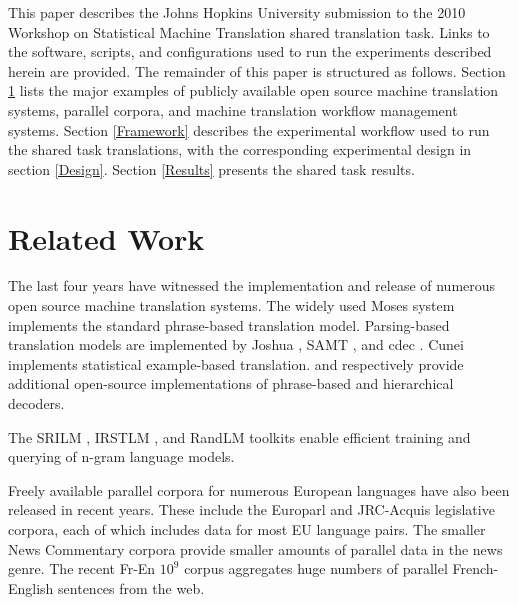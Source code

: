 \documentclass[11pt, a4paper]{article}
\begin{document}
This paper describes the Johns Hopkins University submission to the 2010 Workshop on Statistical Machine Translation shared translation task. Links to the software, scripts, and configurations used to run the experiments described herein are provided. The remainder of this paper is structured as follows. Section \ref{Related Work} lists the major examples of publicly available open source machine translation systems, parallel corpora, and machine translation workflow management systems. Section \ref{Framework} describes the experimental workflow used to run the shared task translations, with the corresponding experimental design in section \ref{Design}. Section \ref{Results} presents the shared task results.






\begin{figure*}[htbp]

\caption{Machine translation workflow. Square nodes in grey indicate software and scripts. The scripts and configuration files used to implement and run this workflow are available for download at \url{http://sourceforge.net/projects/joshua/files/joshua/1.3/wmt2010-experiment.tgz}}
\label{dependencyGraph}
\end{figure*}


\section{Related Work}
\label{Related Work}

The last four years have witnessed the implementation and release of numerous open source machine translation systems. The widely used Moses system \cite{moses} implements the standard phrase-based translation model. Parsing-based translation models are implemented by Joshua \cite{Joshua-WMT}, SAMT \cite{samt2006}, and cdec \cite{cdec}. Cunei \cite{Phillips2009} implements statistical example-based translation.  and  respectively provide additional open-source implementations of phrase-based and hierarchical decoders.

The SRILM \cite{Stolcke2002}, IRSTLM \cite{IRSTLM}, and RandLM \cite{Talbot2007a} toolkits enable efficient training and querying of n-gram language models. 

Freely available parallel corpora for numerous European languages have also been released in recent years. These include the Europarl \cite{Koehn-europarl} and JRC-Acquis \cite{Steinberger-2006} legislative corpora, each of which includes data for most EU language pairs. The smaller News Commentary corpora \cite{Callison-Burch2007a,Callison-Burch2008a} provide smaller amounts of parallel data in the news genre. The recent Fr-En $10^9$ \cite{WMT09-Findings} corpus aggregates huge numbers of parallel French-English sentences from the web.
\end{document}
